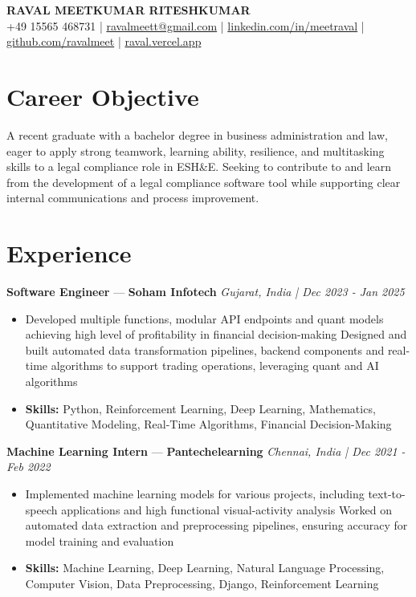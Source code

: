 \documentclass[a4paper,10pt]{article}
\begin{document}
\begin{center}
  {\Large\bfseries RAVAL MEETKUMAR RITESHKUMAR}\\[2pt]
  {\small +49 15565 468731 \;|\; \href{mailto:ravalmeett@gmail.com}{ravalmeett@gmail.com} \;|\; \href{https://www.linkedin.com/in/meetraval/}{linkedin.com/in/meetraval} \;|\; \href{https://github.com/ravalmeet}{github.com/ravalmeet} \;|\; \href{https://raval.vercel.app/}{raval.vercel.app}}
\end{center}
\vspace{-3pt}

\section*{Career Objective}
A recent graduate with a bachelor degree in business administration and law, eager to apply strong teamwork, learning ability, resilience, and multitasking skills to a legal compliance role in ESH\&E. Seeking to contribute to and learn from the development of a legal compliance software tool while supporting clear internal communications and process improvement.\par

\section*{Experience}
\textbf{Software Engineer} — \textbf{Soham Infotech} \hfill \textit{Gujarat, India \;|\; Dec 2023 - Jan 2025}\par
\vspace{1pt}
\begin{itemize}
  \item Developed multiple functions, modular API endpoints and quant models achieving high level of profitability in financial decision-making Designed and built automated data transformation pipelines, backend components and real-time algorithms to support trading operations, leveraging quant and AI algorithms
  \item \textbf{Skills:} Python, Reinforcement Learning, Deep Learning, Mathematics, Quantitative Modeling, Real-Time Algorithms, Financial Decision-Making
\end{itemize}
\vspace{3pt}
\textbf{Machine Learning Intern} — \textbf{Pantechelearning} \hfill \textit{Chennai, India \;|\; Dec 2021 - Feb 2022}\par
\vspace{1pt}
\begin{itemize}
  \item Implemented machine learning models for various projects, including text-to-speech applications and high functional visual-activity analysis Worked on automated data extraction and preprocessing pipelines, ensuring accuracy for model training and evaluation
  \item \textbf{Skills:} Machine Learning, Deep Learning, Natural Language Processing, Computer Vision, Data Preprocessing, Django, Reinforcement Learning
\end{itemize}
\end{document}
